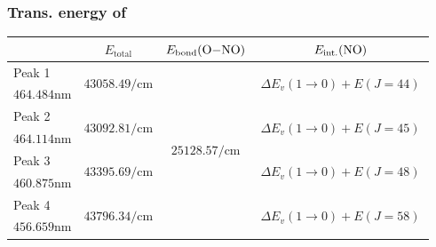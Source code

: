 \documentclass[aspectratio=43,scheme=plain]{ctexbeamer}
\begin{document}
		\subsubsection{Trans. energy of }
	\begin{frame}{\insertsubsection}{\insertsubsubsection}
		\begin{table}[htbp]
			\centering
			\tiny
			\begin{tabularx}{0.9\textwidth}{lccc}
				\toprule
				& $E_\text{total}$ & $E_\text{bond}(\ce{O-NO})$ \footfullcite{ono}& $E_\text{int.}(\ce{NO})$ \\
				\midrule
				Peak 1 & \multirow{2}[2]{*}{$\num{43058.49}\unit{\per \centi \meter}$} & \multirow{8}[8]{*}{$\num{25128.57}\unit{\per \centi \meter}$} & \multirow{2}[2]{*}{\quad\quad\,$\Delta E_v (1\rightarrow 0)+ E( J = 44 )$\quad\quad\,} \\
				$\num{464.484}\unit{\nano\meter}$ & & & \\
				\cmidrule{1-2}\cmidrule{4-4}
				Peak 2 & \multirow{2}[2]{*}{$\num{43092.81}\unit{\per \centi \meter}$} & & \multirow{2}[2]{*}{\quad\quad\,$\Delta E_v (1\rightarrow 0)+ E( J = 45 )$\quad\quad\,} \\
				$\num{464.114}\unit{\nano\meter}$ & & & \\
				\cmidrule{1-2}\cmidrule{4-4}
				Peak 3 & \multirow{2}[2]{*}{$\num{43395.69}\unit{\per \centi \meter}$} & & \multirow{2}[2]{*}{\quad\quad\,$\Delta E_v (1\rightarrow 0)+ E( J = 48 )$\quad\quad\,} \\
				$\num{460.875}\unit{\nano\meter}$ & & & \\
				\cmidrule{1-2}\cmidrule{4-4}
				Peak 4 & \multirow{2}[2]{*}{$\num{43796.34}\unit{\per \centi \meter}$} & & \multirow{2}[2]{*}{\quad\quad\,$\Delta E_v (1\rightarrow 0)+ E( J = 58 )$\quad\quad\,} \\
				$\num{456.659}\unit{\nano\meter}$ & & & \\
				\bottomrule
			\end{tabularx}
		\end{table}
	\end{frame}
\end{document}
